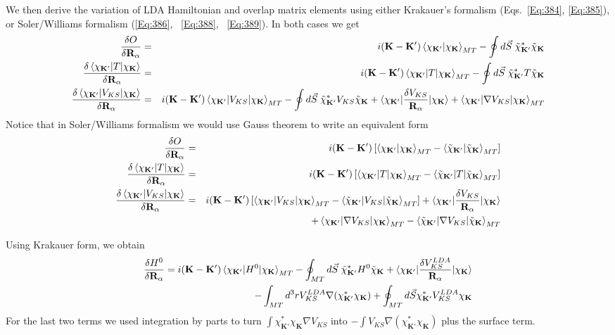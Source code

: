 \documentclass[aps,prb,floatfix,epsfig,singlecolumn,showpacs,preprintnumbers]{revtex4}
\newcommand{\vR}{{\mathbf{R}}}
\newcommand{\vK}{{\mathbf{K}}}
\begin{document}
We then derive the variation of LDA Hamiltonian and overlap
matrix elements using either Krakauer's formalism (Eqs.~\ref{Eq:384},
\ref{Eq:385}), or Soler/Williams formalism (\ref{Eq:386},
~\ref{Eq:388}, ~\ref{Eq:389}). In both cases we get
\begin{eqnarray}
\frac{\delta O}{\delta\vR_\alpha} &=& 
 i(\vK-\vK')\braket{\chi_{\vK'}|\chi_{\vK}}_{MT} - \oint d\vec{S}\; \tilde{\chi}^*_{\vK'}\tilde{\chi}_{\vK}
\\
\frac{\delta\braket{\chi_{\vK'}|T|\chi_{\vK}}}{\delta\vR_\alpha}&=&
i(\vK-\vK')\braket{\chi_{\vK'}|T|\chi_{\vK}}_{MT} - \oint  d\vec{S}\; \tilde{\chi}^*_{\vK'} T \tilde{\chi}_{\vK}
\label{Eq:276}\\
\frac{\delta\braket{\chi_{\vK'}|V_{KS}|\chi_{\vK}}}{\delta\vR_\alpha}&=&
i(\vK-\vK')\braket{\chi_{\vK'}|V_{KS}|\chi_{\vK}}_{MT} 
- \oint  d\vec{S}\; \tilde{\chi}^*_{\vK'} V_{KS} \tilde{\chi}_{\vK}
+\braket{\chi_{\vK'}|\frac{\delta V_{KS}}{\vR_\alpha}|\chi_{\vK}}
+\braket{\chi_{\vK'}|\nabla V_{KS}|\chi_{\vK}}_{MT}
\nonumber 
\\
\end{eqnarray}
Notice that in Soler/Williams formalism we would use Gauss theorem to
write an equivalent form
\begin{eqnarray}
\frac{\delta O}{\delta\vR_\alpha} &=& 
 i(\vK-\vK')\left[
\braket{\chi_{\vK'}|\chi_{\vK}}_{MT} -\braket{\tilde{\chi}_{\vK'}|\tilde{\chi}_{\vK}}_{MT}
\right]
\\
\frac{\delta\braket{\chi_{\vK'}|T|\chi_{\vK}}}{\delta\vR_\alpha}&=&
i(\vK-\vK')
\left[\braket{\chi_{\vK'}|T|\chi_{\vK}}_{MT} - \braket{\tilde{\chi}_{\vK'}|T|\tilde{\chi}_{\vK}}_{MT}\right]
\\
\frac{\delta\braket{\chi_{\vK'}|V_{KS}|\chi_{\vK}}}{\delta\vR_\alpha}&=&
i(\vK-\vK')\left[\braket{\chi_{\vK'}|V_{KS}|\chi_{\vK}}_{MT} -\braket{\tilde{\chi}_{\vK'}|V_{KS}|\tilde{\chi}_{\vK}}_{MT}\right]
+\braket{\chi_{\vK'}|\frac{\delta V_{KS}}{\vR_\alpha}|\chi_{\vK}}
\nonumber\\ 
&& +\braket{\chi_{\vK'}|\nabla V_{KS}|\chi_{\vK}}_{MT}
-\braket{\tilde{\chi}_{\vK'}|\nabla V_{KS}|\tilde{\chi}_{\vK}}_{MT}
\end{eqnarray}


Using Krakauer form, we obtain
\begin{eqnarray}
\frac{\delta H^0}{\delta\vR_\alpha}=
i(\vK-\vK')\braket{\chi_{\vK'}|H^0|\chi_{\vK}}_{MT} - \oint_{MT}  d\vec{S}\; \tilde{\chi}^*_{\vK'} H^0 \tilde{\chi}_{\vK}
+\braket{\chi_{\vK'}|\frac{\delta
  V_{KS}^{LDA}}{\vR_\alpha}|\chi_{\vK}}
\nonumber\\
-\int_{MT}d^3r V_{KS}^{LDA} \nabla(\chi^*_{\vK'} \chi_{\vK})
+\oint_{MT} d\vec{S} \chi^*_{\vK'} V_{KS}^{LDA} \chi_{\vK}
\end{eqnarray}
For the last two terms we used integration by parts to turn 
$\int \chi^*_{\vK'} \chi_{\vK} \nabla V_{KS}$ into $-\int
V_{KS}\nabla(\chi^*_{\vK'} \chi_{\vK})$ plus the surface term.
\end{document}
